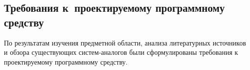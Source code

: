 \subsection{Требования к~проектируемому программному средству}
\label{sec:analysis:research:req}










По результатам изучения предметной области, анализа литературных источников и обзора существующих систем-аналогов были сформулированы требования к проектируемому программному средству.